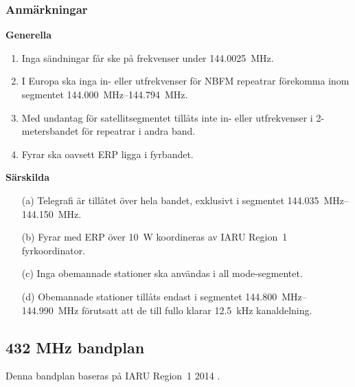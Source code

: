 \subsubsection*{Anmärkningar}

\noindent\textbf{Generella}

\begin{enumerate}[label=\alph*.]
\item Inga sändningar får ske på frekvenser under \SI{144,0025}{\mega\hertz}.
\item I Europa ska inga in- eller utfrekvenser för NBFM repeatrar
  förekomma inom segmentet \SIrange{144,000}{144,794}{\mega\hertz}.
\item Med undantag för satellitsegmentet tillåts inte in- eller
  utfrekvenser i 2-metersbandet för repeatrar i andra band.
\item Fyrar ska oavsett ERP ligga i fyrbandet.
\end{enumerate}

\noindent\textbf{Särskilda}

\begin{itemize}
\item[(a)] Telegrafi är tillåtet över hela bandet, exklusivt i segmentet
  \SIrange{144,035}{144,150}{\mega\hertz}.
\item[(b)] Fyrar med ERP över \SI{10}{\watt} koordineras av IARU Region~1 fyrkoordinator.
\item[(c)] Inga obemannade stationer ska användas i all mode-segmentet.
\item[(d)] Obemannade stationer tillåts endast i segmentet \SIrange{144,800}{144,990}{\mega\hertz}
förutsatt att de till fullo klarar \SI{12,5}{\kilo\hertz} kanaldelning.
\end{itemize}

\newpage

\subsection{432 MHz bandplan}
\label{432MHzbandplan}
Denna bandplan baseras på IARU Region~1 2014 \cite{IARU1}.

